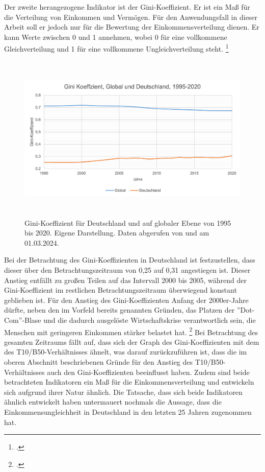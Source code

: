 Der zweite herangezogene Indikator ist der Gini-Koeffizient. Er ist ein Ma{\ss} für die Verteilung von Einkommen und Vermögen. Für den Anwendungsfall in dieser Arbeit soll er jedoch nur für die Bewertung der Einkommensverteilung dienen. Er kann Werte zwischen 0 und 1 annehmen, wobei 0 für eine vollkommene Gleichverteilung und 1 für eine vollkommene Ungleichverteilung steht. \footcite[Vgl.][]{gini_definition_diw_2024}

\begin{figure}[h]
    \centering
    \includegraphics[height=8cm]{Bilder/Gini-Koeffizient2.png}
    \caption[Gini-Koeffizient, Deutschland und global, 1995-2020]{Gini-Koeffizient für Deutschland und auf globaler Ebene von 1995 bis 2020. Eigene Darstellung. Daten abgerufen von \cite[][, S.56 (global)]{wir_2022} und \cite[][(Deutschland)]{bmas_arb_gini_2020} am 01.03.2024.}
    \label{fig:iso_norm}
\end{figure}

Bei der Betrachtung des Gini-Koeffizienten in Deutschland ist festzustellen, dass dieser über den Betrachtungszeitraum von 0,25 auf 0,31 angestiegen ist. Dieser Anstieg entfällt zu gro{\ss}en Teilen auf das Intervall 2000 bis 2005, während der Gini-Koeffizient im restlichen Betrachtungszeitraum überwiegend konstant geblieben ist. Für den Anstieg des Gini-Koeffizienten Anfang der 2000er-Jahre dürfte, neben den im Vorfeld bereits genannten Gründen, das Platzen der ''Dot-Com''-Blase und die dadurch ausgelöste Wirtschaftskrise verantwortlich sein, die Menschen mit geringeren Einkommen stärker belastet hat. \footcite[Vgl. ][S. 3]{horn_wirtschaftskrise_2014} Bei Betrachtung des gesamten Zeitraums fällt auf, dass sich der Graph des Gini-Koeffizienten mit dem des T10/B50-Verhältnisses ähnelt, was darauf zurückzuführen ist, dass die im oberen Abschnitt beschriebenen Gründe für den Anstieg des T10/B50-Verhältnisses auch den Gini-Koeffizienten beeinflusst haben. Zudem sind beide betrachteten Indikatoren ein Ma{\ss} für die Einkommensverteilung und entwickeln sich aufgrund ihrer Natur ähnlich. Die Tatsache, dass sich beide Indikatoren ähnlich entwickelt haben untermauert nochmals die Aussage, dass die Einkommensungleichheit in Deutschland in den letzten 25 Jahren zugenommen hat.

